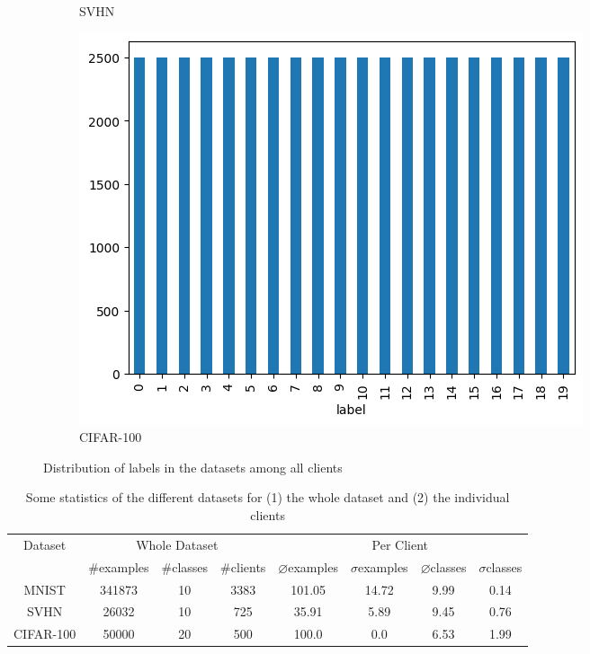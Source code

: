 \begin{figure}[tb]
\begin{subfigure}{0.3\textwidth}
		\caption{SVHN}
	\end{subfigure}
	\begin{subfigure}{0.3\textwidth}
		\centering
		\includegraphics[width=\textwidth]{Bilder/cifar_label_distribution.png}
		\caption{CIFAR-100}
	\end{subfigure}
	\caption{Distribution of labels in the datasets among all clients}
\end{figure}

\begin{table}[tb]
	\centering
	\begin{tabular}{|c|c|c|c|c|c|c|c|}
		\hline
		\multirow{2}{4em}{Dataset} & \multicolumn{3}{|c|}{Whole Dataset} & \multicolumn{4}{|c|}{Per Client} \\
		\cline{2-8}
		& \#examples & \#classes & \#clients & $\diameter$examples & $\sigma$examples & $\diameter$classes & $\sigma$classes \\
		\hline
		MNIST & 341873 & 10 & 3383 & 101.05 & 14.72 & 9.99 & 0.14 \\
		SVHN & 26032 & 10 & 725 & 35.91 & 5.89 & 9.45 & 0.76 \\
		CIFAR-100 & 50000 & 20 & 500 & 100.0 & 0.0 & 6.53 & 1.99 \\
		\hline
	\end{tabular}
	\caption{Some statistics of the different datasets for (1) the whole dataset and (2) the individual clients}
	\label{tab:dataset-statistics}
\end{table}

